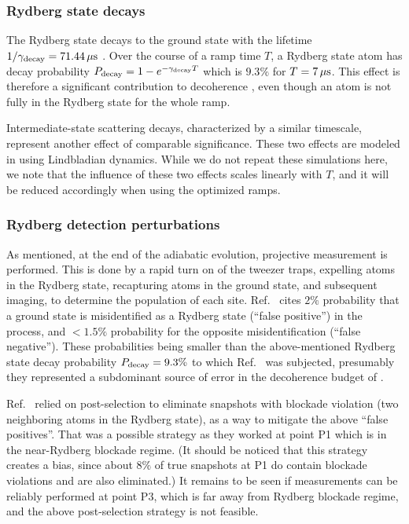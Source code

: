\documentclass[a4paper,11pt]{article}
\theoremstyle{remark}
\theoremstyle{theorem}
\begin{document}
\subsubsection{Rydberg state decays}

The Rydberg state decays to the ground state with the lifetime $1/\gamma_{\rm decay}=71.44\,\mu{\rm s}$ \cite{Fang:2024uyf}. Over the course of a ramp time $T$, a Rydberg state atom has decay probability $P_{\rm decay}=1-e^{-\gamma_{\rm decay} T}$ which is $9.3\%$ for $T=7\,\mu{\rm s}$. This effect is therefore a significant contribution to decoherence \cite{Fang:2024uyf}, even though an atom is not fully in the Rydberg state for the whole ramp.

Intermediate-state scattering decays, characterized by a similar timescale, represent another effect of comparable significance. These two effects are modeled in \cite{Fang:2024uyf} using Lindbladian dynamics. While we do not repeat these simulations here, we note that the influence of these two effects scales linearly with $T$, and it will be reduced accordingly when using the optimized ramps.

\subsubsection{Rydberg detection perturbations}

As mentioned, at the end of the adiabatic evolution, projective measurement is performed. This is done by a rapid turn on of the tweezer traps, expelling atoms in the Rydberg state, recapturing atoms in the ground state, and subsequent imaging, to determine the population of each site. Ref.~\cite{Fang:2024uyf} cites $2\%$ probability that a ground state is misidentified as a Rydberg state (``false positive'') in the process, and $<1.5\%$ probability for the opposite misidentification (``false negative''). These probabilities being smaller than the above-mentioned Rydberg state decay probability $P_{\rm decay}=9.3\%$ to which Ref.~\cite{Fang:2024uyf} was subjected, presumably they represented a subdominant source of error in the decoherence budget of \cite{Fang:2024uyf}.

Ref.~\cite{Fang:2024uyf} relied on post-selection to eliminate snapshots with blockade violation (two neighboring atoms in the Rydberg state), as a way to mitigate the above ``false positives''. That was a possible strategy as they worked at point P1 which is in the near-Rydberg blockade regime. (It should be noticed that this strategy creates a bias, since about $8\%$ of true snapshots at P1 do contain blockade violations \cite{Fang:2024uyf} and are also eliminated.)  It remains to be seen if measurements can be reliably performed at point P3, which is far away from Rydberg blockade regime, and the above post-selection strategy is not feasible.
\end{document}
